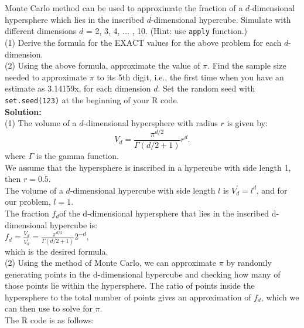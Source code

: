 \documentclass[UTF8]{ctexart}
\begin{document}
\section{}
Monte Carlo method can be used to approximate the fraction of a $d$-dimensional
hypersphere which lies in the inscribed $d$-dimensional hypercube.
Simulate with different dimensions $d$ = 2, 3, 4, $\ldots$ , 10. (Hint: use \texttt{apply} function.)\\
(1) Derive the formula for the EXACT values for the above problem for each $d$-dimension.\\
(2) Using the above formula, approximate the value of $\pi$.
Find the sample size needed to approximate $\pi$ to its 5th digit, i.e., the first time when you have
an estimate as 3.14159x, for each dimension $d$.
Set the random seed with \texttt{set.seed(123)} at the beginning of your R code.\\
\textbf{Solution:}\\
(1) The volume of a $d$-dimensional hypersphere with radius $r$ is given by:
\begin{equation*}
    V_d = \frac{\pi^{d/2}}{\Gamma(d/2+1)}r^d.
\end{equation*}
where $\Gamma$ is the gamma function.\\
We assume that the hypersphere is inscribed in a hypercube with side length 1, then $r=0.5$.\\
The volume of a $d$-dimensional hypercube with side length $l$ is $V_d^{\prime} = l^d$, and for our problem, $l=1$.\\
The fraction $f_d$​ of the d-dimensional hypersphere that lies in the inscribed d-dimensional hypercube is:\\
$f_d = \frac{V_d}{V_d^{\prime}} = \frac{\pi^{d/2}}{\Gamma(d/2+1)}2^{-d}$,\\
which is the desired formula.\\
(2) Using the method of Monte Carlo, we can approximate $\pi$ by randomly generating points in the d-dimensional hypercube and 
checking how many of those points lie within the hypersphere. The ratio of points inside the hypersphere to the total number of points gives an approximation of 
$f_d$, which we can then use to solve for $\pi$.\\
The R code is as follows:
\end{document}
